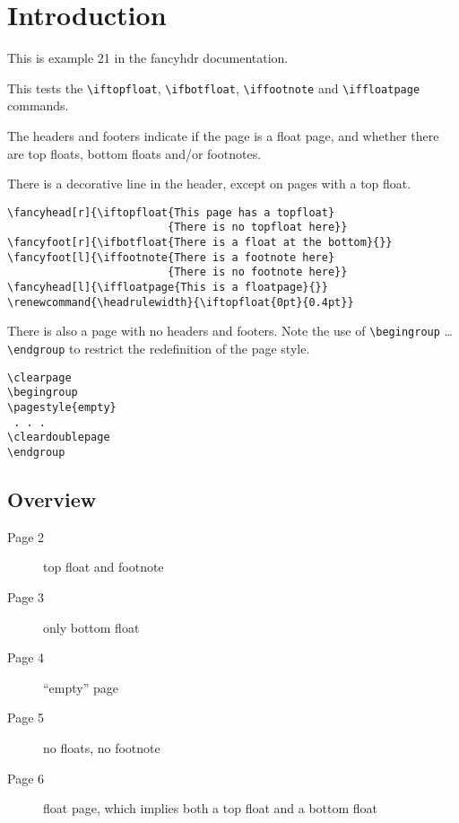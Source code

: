 \documentclass{article}
\renewcommand{\headrulewidth}{\iftopfloat{0pt}{0.4pt}}
\begin{document}
\section{Introduction}
\thispagestyle{plain}

\noindent
\begin{boxedminipage}{\textwidth}
This is example 21 in the fancyhdr documentation.

This tests the \verb|\iftopfloat|, \verb|\ifbotfloat|, \verb|\iffootnote| and \verb|\iffloatpage| commands.

The headers and footers indicate if the page is a float page, and whether there are top floats, bottom floats and/or footnotes.

There is a decorative line in the header, except on pages with a top float.

\begin{verbatim}
\fancyhead[r]{\iftopfloat{This page has a topfloat}
                         {There is no topfloat here}}
\fancyfoot[r]{\ifbotfloat{There is a float at the bottom}{}}
\fancyfoot[l]{\iffootnote{There is a footnote here}
                         {There is no footnote here}}
\fancyhead[l]{\iffloatpage{This is a floatpage}{}}
\renewcommand{\headrulewidth}{\iftopfloat{0pt}{0.4pt}}
\end{verbatim}

There is also a page with no headers and footers. Note the use of \verb|\begingroup| \ldots \verb|\endgroup| to restrict the redefinition of the page style.

\begin{verbatim}
\clearpage
\begingroup
\pagestyle{empty}
 . . .
\cleardoublepage
\endgroup
\end{verbatim}

\subsection{Overview}
\begin{description}
\item [Page 2] top float and footnote
\item [Page 3] only bottom float
\item [Page 4] ``empty'' page
\item [Page 5] no floats, no footnote
\item [Page 6] float page, which implies both a top float and a bottom float
\end{description}

\end{boxedminipage}
\end{document}
